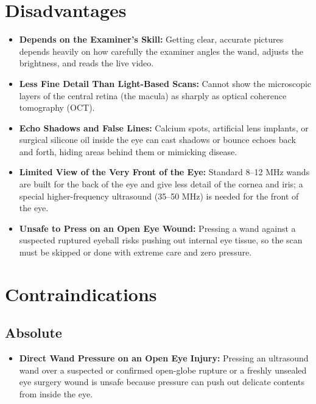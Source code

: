 \section{Disadvantages}
\begin{itemize}
    \item \textbf{Depends on the Examiner's Skill:} Getting clear, accurate pictures depends heavily on how carefully the examiner angles the wand, adjusts the brightness, and reads the live video.
    \item \textbf{Less Fine Detail Than Light-Based Scans:} Cannot show the microscopic layers of the central retina (the macula) as sharply as optical coherence tomography (OCT).
    \item \textbf{Echo Shadows and False Lines:} Calcium spots, artificial lens implants, or surgical silicone oil inside the eye can cast shadows or bounce echoes back and forth, hiding areas behind them or mimicking disease.
    \item \textbf{Limited View of the Very Front of the Eye:} Standard 8--12 MHz wands are built for the back of the eye and give less detail of the cornea and iris; a special higher-frequency ultrasound (35--50 MHz) is needed for the front of the eye.
    \item \textbf{Unsafe to Press on an Open Eye Wound:} Pressing a wand against a suspected ruptured eyeball risks pushing out internal eye tissue, so the scan must be skipped or done with extreme care and zero pressure.
\end{itemize}

\section{Contraindications}

\subsection{Absolute}
\begin{itemize}
    \item \textbf{Direct Wand Pressure on an Open Eye Injury:} Pressing an ultrasound wand over a suspected or confirmed open-globe rupture or a freshly unsealed eye surgery wound is unsafe because pressure can push out delicate contents from inside the eye.
\end{itemize}

